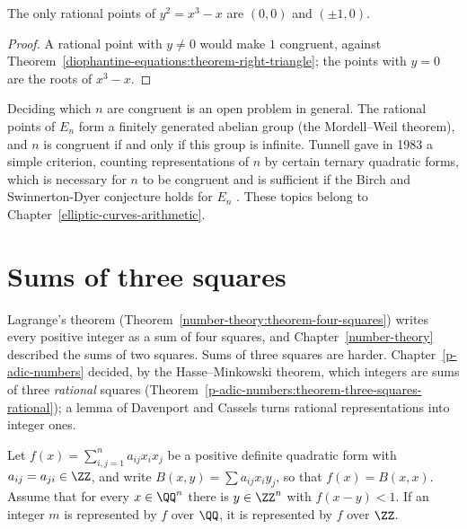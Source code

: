 \begin{corollary}\label{diophantine-equations:corollary-y2-x3-x}
The only rational points of $y^2 = x^3 - x$ are $(0, 0)$ and $(\pm1, 0)$.
\end{corollary}

\begin{proof}
A rational point with $y \neq 0$ would make $1$ congruent, against Theorem~\ref{diophantine-equations:theorem-right-triangle}; the points with $y = 0$ are the roots of $x^3 - x$.
\end{proof}

\begin{remark}\label{diophantine-equations:remark-tunnell}
Deciding which $n$ are congruent is an open problem in general. The rational points of $E_n$ form a finitely generated abelian group (the Mordell--Weil theorem), and $n$ is congruent if and only if this group
is infinite. Tunnell gave in 1983 a simple criterion, counting representations of $n$ by certain ternary quadratic forms, which is necessary for $n$ to be congruent and is sufficient if the Birch and
Swinnerton-Dyer conjecture holds for $E_n$ \cite[Chapter IV]{koblitz-elliptic}. These topics belong to Chapter~\ref{elliptic-curves-arithmetic}.
\end{remark}

\section{Sums of three squares}\label{diophantine-equations:section-three-squares}

Lagrange's theorem (Theorem~\ref{number-theory:theorem-four-squares}) writes every positive integer as a sum of four squares, and Chapter~\ref{number-theory} described the sums of two squares. Sums of three
squares are harder. Chapter~\ref{p-adic-numbers} decided, by the Hasse--Minkowski theorem, which integers are sums of three \emph{rational} squares
(Theorem~\ref{p-adic-numbers:theorem-three-squares-rational}); a lemma of Davenport and Cassels turns rational representations into integer ones.

\begin{lemma}\label{diophantine-equations:lemma-davenport-cassels}
Let $f(x) = \sum_{i, j = 1}^{n} a_{ij}x_ix_j$ be a positive definite quadratic form with $a_{ij} = a_{ji} \in \ZZ$, and write $B(x, y) = \sum a_{ij}x_iy_j$, so that $f(x) = B(x, x)$. Assume that for every
$x \in \QQ^n$ there is $y \in \ZZ^n$ with $f(x - y) < 1$. If an integer $m$ is represented by $f$ over $\QQ$, it is represented by $f$ over $\ZZ$.
\end{lemma}

